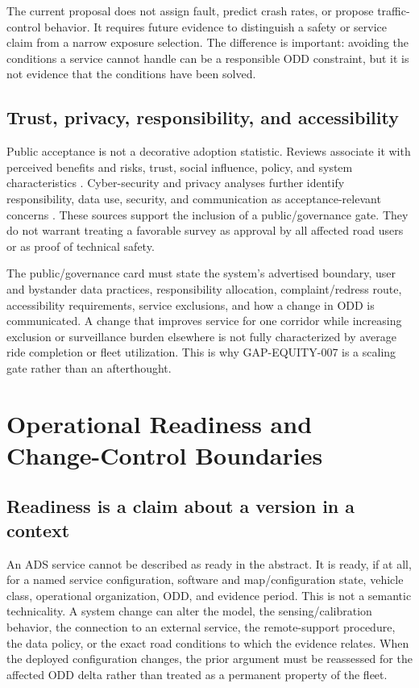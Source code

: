\documentclass[conference]{../../../../Conference-LaTeX-template_10-17-19/IEEEtran}
\begin{document}
The current proposal does not assign fault, predict crash rates, or propose traffic-control behavior. It requires future evidence to distinguish a safety or service claim from a narrow exposure selection. The difference is important: avoiding the conditions a service cannot handle can be a responsible ODD constraint, but it is not evidence that the conditions have been solved.

\subsection{Trust, privacy, responsibility, and accessibility}
Public acceptance is not a decorative adoption statistic. Reviews associate it with perceived benefits and risks, trust, social influence, policy, and system characteristics \cite{othman_2021,nastjuk_etal_2020}. Cyber-security and privacy analyses further identify responsibility, data use, security, and communication as acceptance-relevant concerns \cite{liu_etal_2020}. These sources support the inclusion of a public/governance gate. They do not warrant treating a favorable survey as approval by all affected road users or as proof of technical safety.

The public/governance card must state the system's advertised boundary, user and bystander data practices, responsibility allocation, complaint/redress route, accessibility requirements, service exclusions, and how a change in ODD is communicated. A change that improves service for one corridor while increasing exclusion or surveillance burden elsewhere is not fully characterized by average ride completion or fleet utilization. This is why GAP-EQUITY-007 is a scaling gate rather than an afterthought.

\section{Operational Readiness and Change-Control Boundaries}
\subsection{Readiness is a claim about a version in a context}
An ADS service cannot be described as ready in the abstract. It is ready, if at all, for a named service configuration, software and map/configuration state, vehicle class, operational organization, ODD, and evidence period. This is not a semantic technicality. A system change can alter the model, the sensing/calibration behavior, the connection to an external service, the remote-support procedure, the data policy, or the exact road conditions to which the evidence relates. When the deployed configuration changes, the prior argument must be reassessed for the affected ODD delta rather than treated as a permanent property of the fleet.
\end{document}
